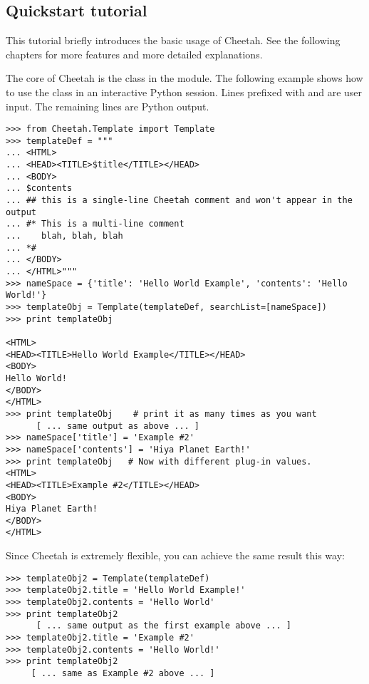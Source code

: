 \subsection{Quickstart tutorial}
\label{gettingStarted.tutorial}

This tutorial briefly introduces the basic usage of Cheetah.  See the
following chapters for more features and more detailed explanations.  

The core of Cheetah is the  class in the 
module. The following example shows how to use the  class in an
interactive Python session. Lines prefixed with \code{>>>} and  are
user input.  The remaining lines are Python output.

\begin{verbatim}
>>> from Cheetah.Template import Template
>>> templateDef = """
... <HTML>
... <HEAD><TITLE>$title</TITLE></HEAD>
... <BODY>
... $contents
... ## this is a single-line Cheetah comment and won't appear in the output
... #* This is a multi-line comment
...    blah, blah, blah 
... *#
... </BODY>
... </HTML>"""
>>> nameSpace = {'title': 'Hello World Example', 'contents': 'Hello World!'}
>>> templateObj = Template(templateDef, searchList=[nameSpace])
>>> print templateObj
 
<HTML>
<HEAD><TITLE>Hello World Example</TITLE></HEAD>
<BODY>
Hello World!
</BODY>
</HTML>
>>> print templateObj    # print it as many times as you want
      [ ... same output as above ... ]
>>> nameSpace['title'] = 'Example #2'
>>> nameSpace['contents'] = 'Hiya Planet Earth!'
>>> print templateObj   # Now with different plug-in values.
<HTML>
<HEAD><TITLE>Example #2</TITLE></HEAD>
<BODY>
Hiya Planet Earth!
</BODY>
</HTML>

\end{verbatim}

Since Cheetah is extremely flexible, you can achieve the same result this
way:  

\begin{verbatim}
>>> templateObj2 = Template(templateDef)
>>> templateObj2.title = 'Hello World Example!'
>>> templateObj2.contents = 'Hello World'
>>> print templateObj2
      [ ... same output as the first example above ... ]
>>> templateObj2.title = 'Example #2'
>>> templateObj2.contents = 'Hello World!'
>>> print templateObj2
     [ ... same as Example #2 above ... ]
\end{verbatim}

